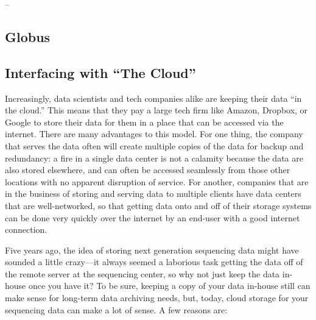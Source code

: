 \documentclass[]{krantz}
\makeatletter
\newenvironment{Shaded}{\begin{snugshade}}{\end{snugshade}}
\newcommand{\ExtensionTok}[1]{#1}
\newcommand{\NormalTok}[1]{#1}
\newenvironment{kframe}{%
\medskip{}
\setlength{\fboxsep}{.8em}
 \def\at@end@of@kframe{}%
 \ifinner\ifhmode%
  \def\at@end@of@kframe{\end{minipage}}%
  \begin{minipage}{\columnwidth}%
 \fi\fi%
 \def\FrameCommand##1{\hskip\@totalleftmargin \hskip-\fboxsep
 \colorbox{shadecolor}{##1}\hskip-\fboxsep
     \hskip-\linewidth \hskip-\@totalleftmargin \hskip\columnwidth}%
 \MakeFramed {\advance\hsize-\width
   \@totalleftmargin\z@ \linewidth\hsize
   \@setminipage}}%
 {\par\unskip\endMakeFramed%
 \at@end@of@kframe}
\renewenvironment{Shaded}{\begin{kframe}}{\end{kframe}}
\makeatother
\begin{document}
\begin{Shaded}
\begin{Highlighting}[]
\NormalTok{[}\ExtensionTok{alignment-play}\NormalTok{]--%
\end{Highlighting}
\end{Shaded}

\hypertarget{globus}{%
\subsection{Globus}\label{globus}}

\hypertarget{interfacing-with-the-cloud}{%
\subsection{Interfacing with ``The Cloud''}\label{interfacing-with-the-cloud}}

Increasingly, data scientists and tech companies alike are keeping their
data ``in the cloud.'' This means that they
pay a large tech firm like Amazon, Dropbox, or Google to store their data for them in
a place that can be accessed via the internet. There are many advantages to this
model. For one thing, the company that serves the data often will create multiple copies
of the data for backup and redundancy: a fire in a single data center is not a calamity
because the data are also stored elsewhere, and can often be accessed seamlessly from those
other locations with no apparent disruption of service. For another, companies that are
in the business of storing and serving
data to multiple clients have data centers that are well-networked, so that getting
data onto and off of their storage systems can be done very quickly over the internet
by an end-user with a good internet connection.

Five years ago, the idea of storing next generation sequencing data might have
sounded a little
crazy---it always seemed a laborious task getting the data off of the remote server at the
sequencing center, so why not just keep the data in-house once you have it?
To be sure, keeping a copy of your
data in-house still can make sense for long-term data archiving needs, but, today, cloud
storage for your sequencing data can make a lot of sense. A few reasons are:
\end{document}
